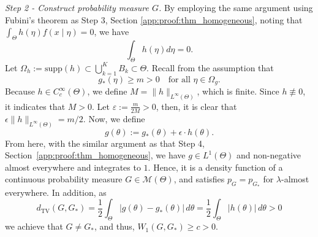 \documentclass[11pt,twoside]{article} %
\begin{document}
\textit{Step 2 - Construct probability measure $G$.}
By employing the same argument using Fubini's theorem as Step 3, Section \ref{app:proof:thm_homogeneous}, noting that $\int_{\Theta}h(\eta)f(x\mid\eta) = 0$, we have  
\begin{equation*}
    \int_{\Theta} h(\eta)d\eta = 0.
\end{equation*}
Let $\Omega_h := \text{supp}(h) \subset \bigcup_{k=1}^K B_k \subset \Theta$. Recall from the assumption that
$$ g_*(\eta) \ge m > 0 \quad \text{for all } \eta \in \Omega_g. $$
Because $h \in C_c^\infty(\Theta)$, we define $M = \|h\|_{L^\infty(\Theta)}$, which is finite. Since $h \not \equiv 0$, it indicates that $M > 0$. Let
$\varepsilon := \frac{m}{2M} > 0$, then, it is clear that $\epsilon \|h\|_{L^\infty(\Theta)} = m/2$. Now, we define
$$g(\theta) := g_{*}(\theta) + \epsilon \cdot h(\theta).$$
From here, with the similar argument as that Step 4, Section~\ref{app:proof:thm_homogeneous},
we have $g \in L^1(\Theta)$ and non-negative almost everywhere and integrates to $1$. Hence, it is a density function of a continuous probability measure $G \in \mathcal{M}(\Theta)$, and satisfies $p_G = p_{G_*}$ for $\lambda$-almost everywhere. In addition, as $$d_{\text{TV}}(G, G_*) = \frac{1}{2}\int_{\Theta}|g(\theta)-g_*(\theta)|\,d\theta = \frac{1}{2}\int_{\Theta}|h(\theta)|\,d\theta > 0$$
we achieve that $G \neq G_{*}$, and thus, $W_1(G,G_*) \geq c> 0$. 



\end{document}

